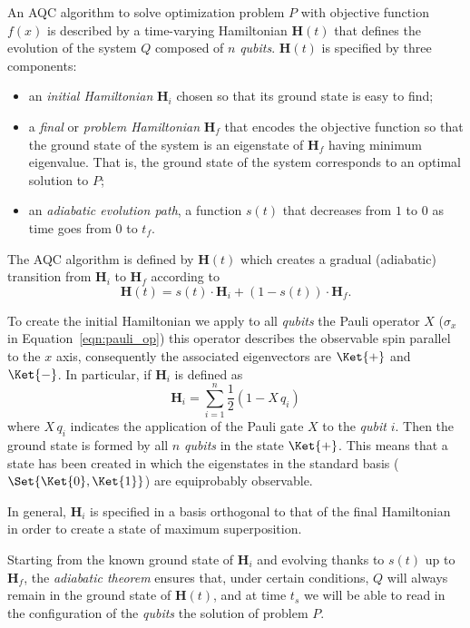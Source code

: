 An AQC algorithm to solve optimization problem $P$ with objective function $f(x)$ is described by a time-varying Hamiltonian $\mathbf{H}(t)$ that defines the evolution of the system $Q$ composed of $n$ \emph{qubits}. $\mathbf{H}(t)$ is specified by three components:
\begin{itemize}
	\item an \emph{initial Hamiltonian} $\mathbf{H}_i$ chosen so that its ground state is easy to find;
	\item a \emph{final} or \emph{problem Hamiltonian} $\mathbf{H}_f$ that encodes the objective function so that the
	ground state of the system is an eigenstate of $\mathbf{H}_f$ having minimum eigenvalue. That is, the ground
	state of the system corresponds to an optimal solution to $P$;
	\item an\emph{ adiabatic evolution path}, a function $s(t)$ that decreases from $1$ to $0$ as time goes from $0$ to $t_f$.
\end{itemize}
The AQC algorithm is defined by $\mathbf{H}(t)$ which creates a gradual (adiabatic) transition from $\mathbf{H}_i$ to $\mathbf{H}_f$ according to
\begin{equation}
	\mathbf{H}(t) = s(t) \cdot \mathbf{H}_i +(1-s(t)) \cdot \mathbf{H}_f.
\end{equation}

To create the initial Hamiltonian we apply to all \emph{qubits} the Pauli operator $X$ ($\sigma_x$ in Equation~\ref{eqn:pauli_op}) \textemdash{}this operator describes the observable spin parallel to the $x$ axis, consequently\textemdash{} the associated eigenvectors are $\Ket{+}$ and $\Ket{-}$. In particular, if $\mathbf{H}_i$ is defined as
\[
\mathbf{H}_i = \sum_{i = 1}^{n} \frac{1}{2} (1 - X\,q_i)
\]
where $X\,q_i$ indicates the application of the Pauli gate $X$ to the \emph{qubit} $i$. Then the ground state is formed by all $n$ \emph{qubits} in the state $\Ket{+}$. This means that a state has been created in which the eigenstates in the standard basis ($\Set{\Ket{0}, \Ket{1}}$) are equiprobably observable.

In general, $\mathbf{H}_i$ is specified in a basis orthogonal to that of the final Hamiltonian in order to create a state of maximum superposition.

Starting from the known ground state of $\mathbf{H}_i$ and evolving thanks to $s(t)$ up to $\mathbf{H}_f$, the \emph{adiabatic theorem} ensures that, under certain conditions, $Q$ will always remain in the ground state of $\mathbf{H}(t)$, and at time $t_s$ we will be able to read in the configuration of the \emph{qubits} the solution of problem $P$.

